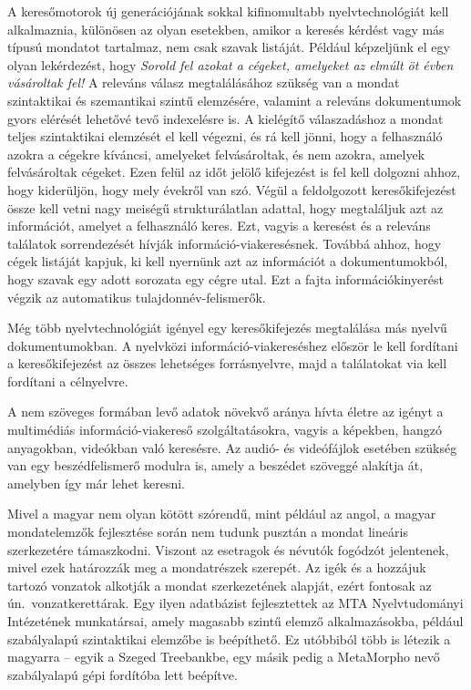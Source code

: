 \begin{multicols}{2}
  A keresőmotorok új generációjának sokkal kifinomultabb nyelvtechnológiát kell al\-kal\-maz\-nia, különösen az olyan esetekben, amikor a keresés kérdést vagy más típusú mondatot tartalmaz, nem csak szavak listáját. Például képzeljünk el egy olyan lekérdezést, hogy \textit{Sorold fel azokat a cégeket, amelyeket az elmúlt öt évben vásároltak fel!} A releváns válasz megtalálásához szükség van a mondat szintaktikai és szemantikai szintű elem\-zé\-sé\-re, valamint a releváns dokumentumok gyors elérését lehetővé tevő indexelésre is. A kielégítő válaszadáshoz a mondat teljes szintaktikai elemzését el kell végezni, és rá kell jönni, hogy a felhasználó azokra a cégekre kíváncsi, amelyeket felvásároltak, és nem azokra, amelyek felvásároltak cégeket. Ezen felül az időt jelölő kifejezést is fel kell dolgozni ahhoz, hogy kiderüljön, hogy mely évekről van szó. Végül a feldolgozott keresőkifejezést össze kell vetni nagy meiségű strukturálatlan adattal, hogy megtaláljuk azt az információt, amelyet a felhasználó keres. Ezt, vagyis a keresést és a releváns találatok sorrendezését hívják információ-viakeresésnek. Továbbá ahhoz, hogy cégek listáját kapjuk, ki kell nyernünk azt az információt a dokumentumokból, hogy szavak egy adott sorozata egy cégre utal. Ezt a fajta információkinyerést végzik az automatikus tulajdonnév-felismerők.  


  Még több nyelvtechnológiát igényel egy keresőkifejezés megtalálása más nyelvű dokumentumokban. A nyelvközi in\-for\-má\-ció-viakereséshez először le kell fordítani a keresőkifejezést az összes lehetséges forrásnyelvre, majd a találatokat via kell fordítani a célnyelvre. 

  A nem szöveges formában levő adatok növekvő aránya hívta életre az igényt a multimédiás információ-viakereső szolgáltatásokra, vagyis a képekben, hangzó anyagokban, videókban való keresésre. Az audió- és videófájlok esetében szükség van egy beszédfelismerő modulra is, amely a beszédet szöveggé alakítja át, amelyben így már lehet keresni.

  Mivel a magyar nem olyan kötött szórendű, mint például az angol, a magyar mondatelemzők fejlesztése során nem tudunk pusztán a mondat lineáris szerkezetére támaszkodni. Viszont az esetragok és névutók fogódzót jelentenek, mivel ezek határozzák meg a mondatrészek szerepét. Az igék és a hozzájuk tartozó vonzatok alkotják a mondat szerkezetének alapját, ezért fontosak az ún.\ vonzatkerettárak. Egy ilyen adatbázist fejlesztettek az MTA Nyelvtudományi Intézetének munkatársai, amely magasabb szintű elemző alkalmazásokba, például szabályalapú szintaktikai elem\-ző\-be is beépíthető. Ez utóbbiból több is létezik a magyarra -- egyik a Szeged Treebankbe, egy másik pedig a MetaMorpho nevő szabályalapú gépi fordítóba lett beépítve. 


\end{multicols}
